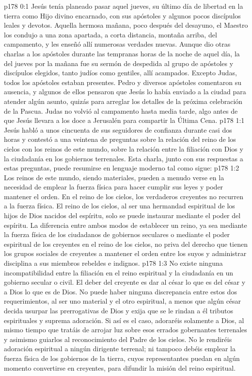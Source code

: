 \author{Comisión de seres intermedios}
\vs p178 0:1 Jesús tenía planeado pasar aquel jueves, su último día de libertad en la tierra como Hijo divino encarnado, con sus apóstoles y algunos pocos discípulos leales y devotos. Aquella hermosa mañana, poco después del desayuno, el Maestro los condujo a una zona apartada, a corta distancia, montaña arriba, del campamento, y les enseñó allí numerosas verdades nuevas. Aunque dio otras charlas a los apóstoles durante las tempranas horas de la noche de aquel día, la del jueves por la mañana fue su sermón de despedida al grupo de apóstoles y discípulos elegidos, tanto judíos como gentiles, allí acampados. Excepto Judas, todos los apóstoles estaban presentes. Pedro y diversos apóstoles comentaron su ausencia, y algunos de ellos pensaron que Jesús lo había enviado a la ciudad para atender algún asunto, quizás para arreglar los detalles de la próxima celebración de la Pascua. Judas no volvió al campamento hasta media tarde, algo antes de que Jesús llevara a los doce a Jerusalén para compartir la Última Cena.
\vs p178 1:1 Jesús habló a unos cincuenta de sus seguidores de confianza durante casi dos horas y contestó a una veintena de preguntas sobre la relación del reino de los cielos con los reinos de este mundo, sobre la relación entre la filiación con Dios y la ciudadanía en los gobiernos terrenales. Esta charla, junto con sus respuestas a estas preguntas, puede resumirse en lenguaje moderno tal como sigue:
\vs p178 1:2 \pc Los reinos de este mundo, siendo materiales, pueden a menudo verse en la necesidad de emplear la fuerza física para hacer cumplir sus leyes y poder mantener el orden. En el reino de los cielos, los verdaderos creyentes no recurren a la fuerza física. El reino de los cielos, al ser una hermandad espiritual de los hijos de Dios nacidos del espíritu, solo se puede instaurar mediante el poder del espíritu. La diferencia entre ambos modos de establecer un reino, ya sea mediante la fuerza física de los ciudadanos de gobiernos seculares o mediante el poder espiritual de los creyentes en el reino de los cielos, no priva del derecho que tienen los grupos sociales de creyentes a mantener el orden entre los suyos y administrar disciplina a sus miembros rebeldes e indignos.
\vs p178 1:3 No existe ninguna incompatibilidad entre la filiación en el reino espiritual y la ciudadanía en un gobierno secular o civil. El deber del creyente es dar al césar lo que es del césar y a Dios lo que es de Dios. No puede haber ninguna discrepancia entre estos dos requerimientos, al ser uno material y el otro espiritual, a menos que algún césar decida usurpar las prerrogativas de Dios y exija que se le rindan a él tributos espirituales y suprema adoración. Si así es el caso, adoraréis solamente a Dios, al mismo tiempo que tratáis de arrojar luz sobre esos errados gobernantes terrenales y asimismo guiarlos al reconocimiento del Padre de los cielos. No le rendiréis adoración espiritual a ningún dirigente terrenal; ni tampoco debéis emplear la fuerza física de los gobiernos de la tierra, cuyos representantes puedan en algún momento convertirse en creyentes, para difundir la misión del reino espiritual.
